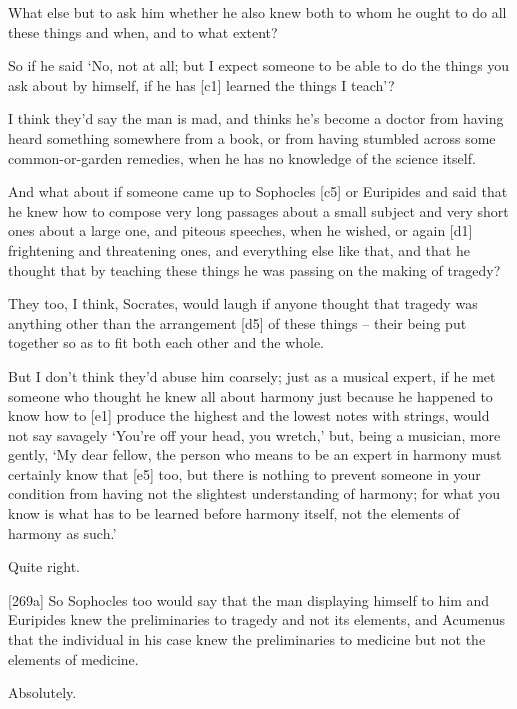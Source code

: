  What else but to ask him whether he also knew both to whom he
ought to do all these things and when, and to what extent?

 So if he said ‘No, not at all; but I expect someone to be able
to do the things you ask about by himself, if he has {[}c1{]} learned
the things I teach'?

 I think they'd say the man is mad, and thinks he's become a
doctor from having heard something somewhere from a book, or from having
stumbled across some common-or-garden remedies, when he has no knowledge
of the science itself.

 And what about if someone came up to Sophocles {[}c5{]} or
Euripides and said that he knew how to compose very long passages about
a small subject and very short ones about a large one, and piteous
speeches, when he wished, or again {[}d1{]} frightening and threatening
ones, and everything else like that, and that he thought that by
teaching these things he was passing on the making of tragedy?

 They too, I think, Socrates, would laugh if anyone thought that
tragedy was anything other than the arrangement {[}d5{]} of these things
-- their being put together so as to fit both each other and the whole.

 But I don't think they'd abuse him coarsely; just as a musical
expert, if he met someone who thought he knew all about harmony just
because he happened to know how to {[}e1{]} produce the highest and the
lowest notes with strings, would not say savagely ‘You're off your head,
you wretch,' but, being a musician, more gently, ‘My dear fellow, the
person who means to be an expert in harmony must certainly know that
{[}e5{]} too, but there is nothing to prevent someone in your condition
from having not the slightest understanding of harmony; for what you
know is what has to be learned before harmony itself, not the elements
of harmony as such.'

 Quite right.

{[}269a{]}  So Sophocles too would say that the man displaying
himself to him and Euripides knew the preliminaries to tragedy and not
its elements, and Acumenus that the individual in his case knew the
preliminaries to medicine but not the elements of medicine.

 Absolutely.

